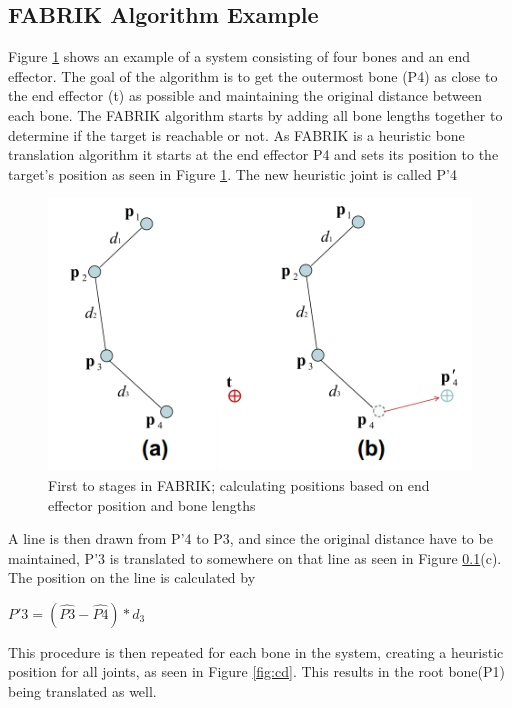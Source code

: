 \subsection{FABRIK Algorithm Example}

Figure \ref{fig:ab} shows an example of a system consisting of four bones and an end effector. The goal of the algorithm is to get the outermost bone (P4) as close to the end effector (t) as possible and maintaining the original distance between each bone. 
The FABRIK algorithm starts by adding all bone lengths together to determine if the target is reachable or not. 
As FABRIK is a heuristic bone translation algorithm it starts at the end effector P4 and sets its position to the target's position as seen in Figure \ref{fig:ab}. The new heuristic joint is called P'4 

\begin{figure}[H]
\centering
\includegraphics[width=1\textwidth]{FABRIK/ab}
\caption{First to stages in FABRIK; calculating positions based on end effector position and bone lengths}
\label{fig:ab}
\end{figure}

A line is then drawn from P'4 to P3, and since the original distance have to be maintained, P'3 is translated to somewhere on that line as seen in Figure \ref{}(c). The position on the line is calculated by 

$P'3 = (\hat{P3} - \hat{P4}) * d_{3}$

This procedure is then repeated for each bone in the system, creating a heuristic position for all joints, as seen in Figure \ref{fig:cd}. This results in the root bone(P1) being translated as well. 

